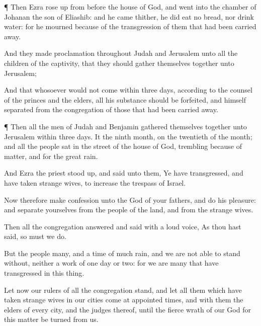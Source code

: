 {\par }{\PP {}¶ Then
Ezra rose
up from
before the
house of
God, and
went into the
chamber of
Johanan the
son of
Eliashib: and
{} he
came thither, he did
eat no
bread, nor
drink
water: for he
mourned because of the
transgression of them that had been carried
away.

And they made
proclamation throughout
Judah and
Jerusalem unto all the
children of the
captivity, that they should gather themselves
together unto
Jerusalem;

And that whosoever would not
come within
three
days, according to the
counsel of the
princes and the
elders, all his
substance should be
forfeited, and himself
separated from the
congregation of those that had been carried
away.


\par }{\PP {}¶ Then all the
men of
Judah and
Benjamin gathered themselves
together unto
Jerusalem within
three
days. It
{} the
ninth
month, on the
twentieth
{} of the
month; and all the
people
sat in the
street of the
house of
God,
trembling because of
{}
matter, and for the great
rain.

And
Ezra the
priest stood
up, and
said unto them, Ye have
transgressed, and have
taken
strange
wives, to
increase the
trespass of
Israel.

Now therefore
make
confession unto the
{}
God of your
fathers, and
do his
pleasure: and
separate yourselves from the
people of the
land, and from the
strange
wives.

Then all the
congregation
answered and
said with a
loud
voice, As thou hast
said, so must we
do.

But the
people
{}
many, and
{} a
time of much
rain, and we are not
able to
stand
without, neither
{} a
work of
one
day or
two: for we are
many that have
transgressed in this
thing.

Let now our
rulers of all the
congregation
stand, and let all them which have
taken
strange
wives in our
cities
come at
appointed
times, and with them the
elders of every
city, and the
judges thereof, until the
fierce
wrath of our
God for this
matter be
turned from us.


}
